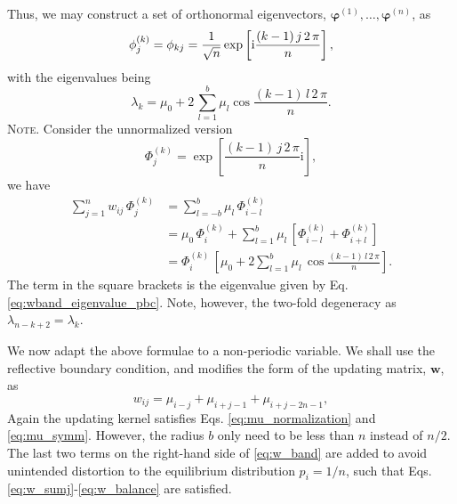 \documentclass[reprint, floatfix]{revtex4-1}
\newcommand{\note}[1]{{\color{DarkGreen}\footnotesize \textsc{Note.} #1}}
\newcommand{\ii}{\mathrm{i}}
\begin{document}
Thus,
we may construct a set of orthonormal eigenvectors,
$\pmb\varphi^{(1)}, \dots, \pmb\varphi^{(n)}$,
as
\begin{equation}
  \phi^{(k)}_j
  =
  \phi_{kj}
  =
  \frac{1}{\sqrt n}
  \exp
  \left[
    \ii
    \frac{ (k - 1) \, j \, 2 \, \pi }
         {            n             }
  \right]
  ,
  \notag
\end{equation}
%
with the eigenvalues being
%
\begin{equation}
  \lambda_k
  =
  \mu_0
  +
  2 \,
  \sum_{ l = 1 }^b
  \mu_l
  \cos
  \frac{ (k - 1) \, l \, 2 \, \pi }
       {            n             }
  .
  \label{eq:wband_eigenvalue_pbc}
\end{equation}
%
\note{Consider the unnormalized version
  $$
  \Phi^{(k)}_j =
  \exp\left[
    \frac{ ( k - 1 ) \, j \, 2 \, \pi }
         {              n             }
    \ii
  \right]
  ,
  $$
  we have
  $$
  \begin{aligned}
  \sum_{j = 1}^n
    w_{ij} \, \Phi^{(k)}_j
  &=
  \sum_{l = -b}^b
    \mu_l \, \Phi^{(k)}_{i - l}
  \\
  &=
  \mu_0 \, \Phi^{(k)}_i
  +
  \sum_{l = 1}^b
    \mu_l \,
    \left[ \Phi^{(k)}_{i - l} + \Phi^{(k)}_{i + l} \right]
  \\
  &=
  \Phi^{(k)}_i \,
  \left[
    \mu_0
    +
    2 \sum_{l = 1}^b
      \mu_l \, \cos
      \frac{ (k - 1) \, l \, 2 \, \pi }
           {            n             }
  \right]
  .
  \end{aligned}
  $$
  The term in the square brackets is the eigenvalue given by
  Eq. \eqref{eq:wband_eigenvalue_pbc}.
}
%
Note, however, the two-fold degeneracy as
$\lambda_{n - k + 2} = \lambda_k$.



We now adapt the above formulae to a non-periodic variable.
%
We shall use the reflective boundary condition\cite{bussi2006},
and modifies the form of the updating matrix, $\mathbf w$, as
%
%
\begin{equation}
  w_{ij}
  =
  \mu_{ i - j }
  +
  \mu_{ i + j - 1 }
  +
  \mu_{ i + j - 2 n - 1 },
  \label{eq:w_band}
\end{equation}
%
Again the updating kernel satisfies
Eqs. \eqref{eq:mu_normalization}
and
\eqref{eq:mu_symm}.
%
However,
the radius $b$ only need to be less than $n$
instead of $n/2$.
%
The last two terms
on the right-hand side of \eqref{eq:w_band} are added
to avoid unintended distortion\cite{dickson2011, mcgovern2013}
to the equilibrium distribution $p_i = 1/n$\cite{bussi2006},
such that Eqs. \eqref{eq:w_sumj}-\eqref{eq:w_balance}
are satisfied.
\end{document}

